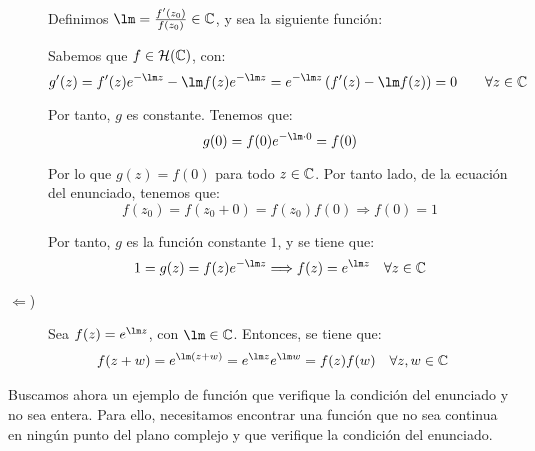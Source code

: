 \begin{ejercicio}
\begin{description}
        Definimos $\lm = \frac{f'(z_0)}{f(z_0)}\in \bb{C}$, y sea la siguiente función:

        Sabemos que $f\in \mathcal{H}(\mathbb{C})$, con:
        \begin{equation*}
            g'(z) = f'(z)e^{-\lm z} - \lm f(z)e^{-\lm z} = e^{-\lm z}\left(f'(z) - \lm f(z)\right) = 0\qquad \forall z\in \bb{C}
        \end{equation*}

        Por tanto, $g$ es constante. Tenemos que:
        \begin{equation*}
            g(0)=f(0)e^{-\lm\cdot 0} = f(0)
        \end{equation*}
        
        Por lo que $g(z) = f(0)$ para todo $z\in \mathbb{C}$. Por tanto lado, de la ecuación del enunciado, tenemos que:
        \begin{equation*}
            f(z_0)=f(z_0+0)=f(z_0)f(0) \Longrightarrow f(0)=1
        \end{equation*}

        Por tanto, $g$ es la función constante $1$, y se tiene que:
        \begin{equation*}
            1=g(z) = f(z)e^{-\lm z} \Longrightarrow f(z) = e^{\lm z} \quad \forall z\in \bb{C}
        \end{equation*}

        \item[$\Longleftarrow$)] Sea $f(z) = e^{\lm z}$, con $\lm \in \bb{C}$. Entonces, se tiene que:
        \begin{align*}
            f(z+w) &= e^{\lm(z+w)} = e^{\lm z}e^{\lm w} = f(z)f(w) \quad \forall z,w\in \bb{C}
        \end{align*}
    \end{description}

    Buscamos ahora un ejemplo de función que verifique la condición del enunciado y no sea entera. Para ello, necesitamos encontrar una función que no sea continua en ningún punto del plano complejo y que verifique la condición del enunciado.
\end{ejercicio}

